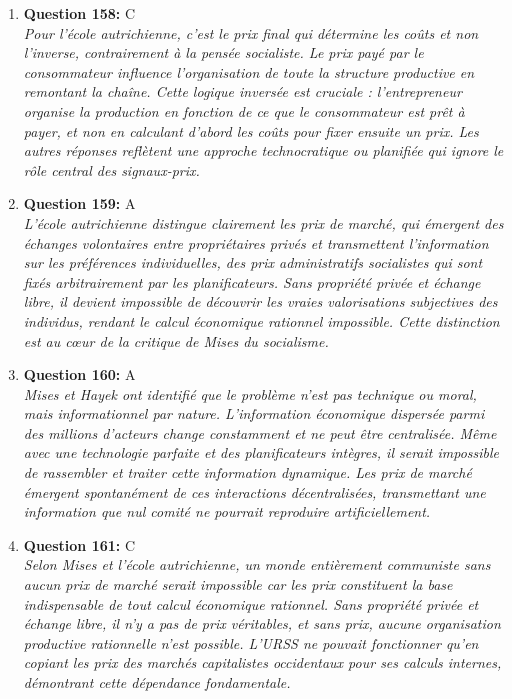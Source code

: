 \documentclass[12pt,a4paper]{article}
\begin{document}
\begin{enumerate}
\item \textbf{Question 158:} C
\\ \textit{Pour l'école autrichienne, c'est le prix final qui détermine les coûts et non l'inverse, contrairement à la pensée socialiste. Le prix payé par le consommateur influence l'organisation de toute la structure productive en remontant la chaîne. Cette logique inversée est cruciale : l'entrepreneur organise la production en fonction de ce que le consommateur est prêt à payer, et non en calculant d'abord les coûts pour fixer ensuite un prix. Les autres réponses reflètent une approche technocratique ou planifiée qui ignore le rôle central des signaux-prix.}

\item \textbf{Question 159:} A
\\ \textit{L'école autrichienne distingue clairement les prix de marché, qui émergent des échanges volontaires entre propriétaires privés et transmettent l'information sur les préférences individuelles, des prix administratifs socialistes qui sont fixés arbitrairement par les planificateurs. Sans propriété privée et échange libre, il devient impossible de découvrir les vraies valorisations subjectives des individus, rendant le calcul économique rationnel impossible. Cette distinction est au cœur de la critique de Mises du socialisme.}

\item \textbf{Question 160:} A
\\ \textit{Mises et Hayek ont identifié que le problème n'est pas technique ou moral, mais informationnel par nature. L'information économique dispersée parmi des millions d'acteurs change constamment et ne peut être centralisée. Même avec une technologie parfaite et des planificateurs intègres, il serait impossible de rassembler et traiter cette information dynamique. Les prix de marché émergent spontanément de ces interactions décentralisées, transmettant une information que nul comité ne pourrait reproduire artificiellement.}

\item \textbf{Question 161:} C
\\ \textit{Selon Mises et l'école autrichienne, un monde entièrement communiste sans aucun prix de marché serait impossible car les prix constituent la base indispensable de tout calcul économique rationnel. Sans propriété privée et échange libre, il n'y a pas de prix véritables, et sans prix, aucune organisation productive rationnelle n'est possible. L'URSS ne pouvait fonctionner qu'en copiant les prix des marchés capitalistes occidentaux pour ses calculs internes, démontrant cette dépendance fondamentale.}


\end{enumerate}
\end{document}
